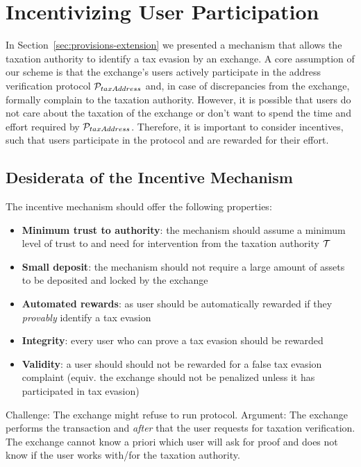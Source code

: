 \section{Incentivizing User Participation}\label{sec:incentives}

In Section~\ref{sec:provisions-extension} we presented a mechanism that allows
the taxation authority to identify a tax evasion by an exchange. A core
assumption of our scheme is that the exchange's users actively participate in
the address verification protocol $\mathcal{P}_{taxAddress}$ and, in case of
discrepancies from the exchange, formally complain to the taxation authority.
However, it is possible that users do not care about the taxation of the
exchange or don't want to spend the time and effort required by
$\mathcal{P}_{taxAddress}$. Therefore, it is important to consider incentives,
such that users participate in the protocol and are rewarded for their effort.

\subsection{Desiderata of the Incentive Mechanism}\label{subsec:incentive-desiderata}

The incentive mechanism should offer the following properties:

\begin{itemize}
    \item \textbf{Minimum trust to authority}: the mechanism should assume a
        minimum level of trust to and need for intervention from the taxation
        authority $\mathcal{T}$
    \item \textbf{Small deposit}: the mechanism should not require a large
        amount of assets to be deposited and locked by the exchange
    \item \textbf{Automated rewards}: as user should be automatically
        rewarded if they \emph{provably} identify a tax evasion
    \item \textbf{Integrity}: every user who can prove a tax evasion should be
        rewarded
    \item \textbf{Validity}: a user should should not be rewarded for a false
        tax evasion complaint (equiv. the exchange should not be penalized
        unless it has participated in tax evasion)
\end{itemize}

Challenge:
    The exchange might refuse to run protocol.
Argument:
    The exchange performs the transaction and \emph{after} that the user
    requests for taxation verification. The exchange cannot know a priori which
    user will ask for proof and does not know if the user works with/for the
    taxation authority.

